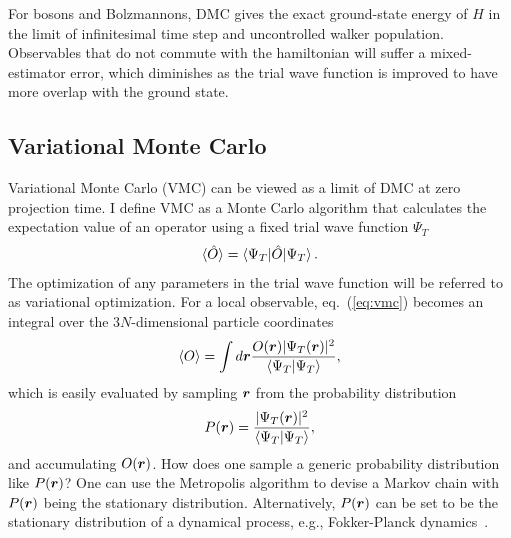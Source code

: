 For bosons and Bolzmannons, DMC gives the exact ground-state energy of $H$ in the limit of infinitesimal time step and uncontrolled walker population. Observables that do not commute with the hamiltonian will suffer a mixed-estimator error, which diminishes as the trial wave function is improved to have more overlap with the ground state.

\subsection{Variational Monte Carlo}
Variational Monte Carlo (VMC) can be viewed as a limit of DMC at zero projection time. I define VMC as a Monte Carlo algorithm that calculates the expectation value of an operator using a fixed trial wave function $\Psi_T$
\begin{align} \label{eq:vmc}
\braket{\hat{O}} = \braket{\Psi_T|\hat{O}|\Psi_T}.
\end{align}
The optimization of any parameters in the trial wave function will be referred to as variational optimization.
For a local observable, eq.~(\ref{eq:vmc}) becomes an integral over the $3N$-dimensional particle coordinates
\begin{align}
\braket{O} = \int d\boldsymbol{r} \dfrac{O(\boldsymbol{r})\vert\Psi_T(\boldsymbol{r})\vert^2}{\braket{\Psi_T|\Psi_T}},
\end{align}
which is easily evaluated by sampling $\boldsymbol{r}$ from the probability distribution
\begin{align}
P(\boldsymbol{r}) = \dfrac{\vert\Psi_T(\boldsymbol{r})\vert^2}{\braket{\Psi_T|\Psi_T}},
\end{align}
and accumulating $O(\boldsymbol{r})$. How does one sample a generic probability distribution like $P(\boldsymbol{r})$? One can use the Metropolis algorithm to devise a Markov chain with $P(\boldsymbol{r})$ being the stationary distribution. Alternatively, $P(\boldsymbol{r})$ can be set to be the stationary distribution of a dynamical process, e.g., Fokker-Planck dynamics~\cite{Hammond1994}.

